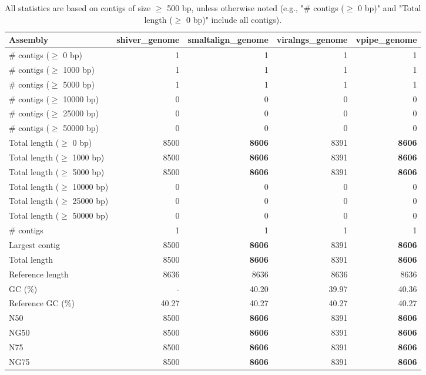 \documentclass[12pt,a4paper]{article}
\begin{document}
\begin{table}[ht]
\begin{center}
\caption{All statistics are based on contigs of size $\geq$ 500 bp, unless otherwise noted (e.g., "\# contigs ($\geq$ 0 bp)" and "Total length ($\geq$ 0 bp)" include all contigs).}
\begin{tabular}{|l*{4}{|r}|}
\hline
Assembly & shiver\_genome & smaltalign\_genome & viralngs\_genome & vpipe\_genome \\ \hline
\# contigs ($\geq$ 0 bp) & 1 & 1 & 1 & 1 \\ \hline
\# contigs ($\geq$ 1000 bp) & 1 & 1 & 1 & 1 \\ \hline
\# contigs ($\geq$ 5000 bp) & 1 & 1 & 1 & 1 \\ \hline
\# contigs ($\geq$ 10000 bp) & 0 & 0 & 0 & 0 \\ \hline
\# contigs ($\geq$ 25000 bp) & 0 & 0 & 0 & 0 \\ \hline
\# contigs ($\geq$ 50000 bp) & 0 & 0 & 0 & 0 \\ \hline
Total length ($\geq$ 0 bp) & 8500 & {\bf 8606} & 8391 & {\bf 8606} \\ \hline
Total length ($\geq$ 1000 bp) & 8500 & {\bf 8606} & 8391 & {\bf 8606} \\ \hline
Total length ($\geq$ 5000 bp) & 8500 & {\bf 8606} & 8391 & {\bf 8606} \\ \hline
Total length ($\geq$ 10000 bp) & 0 & 0 & 0 & 0 \\ \hline
Total length ($\geq$ 25000 bp) & 0 & 0 & 0 & 0 \\ \hline
Total length ($\geq$ 50000 bp) & 0 & 0 & 0 & 0 \\ \hline
\# contigs & 1 & 1 & 1 & 1 \\ \hline
Largest contig & 8500 & {\bf 8606} & 8391 & {\bf 8606} \\ \hline
Total length & 8500 & {\bf 8606} & 8391 & {\bf 8606} \\ \hline
Reference length & 8636 & 8636 & 8636 & 8636 \\ \hline
GC (\%) & - & 40.20 & 39.97 & 40.36 \\ \hline
Reference GC (\%) & 40.27 & 40.27 & 40.27 & 40.27 \\ \hline
N50 & 8500 & {\bf 8606} & 8391 & {\bf 8606} \\ \hline
NG50 & 8500 & {\bf 8606} & 8391 & {\bf 8606} \\ \hline
N75 & 8500 & {\bf 8606} & 8391 & {\bf 8606} \\ \hline
NG75 & 8500 & {\bf 8606} & 8391 & {\bf 8606} \\ \hline

\end{tabular}
\end{center}
\end{table}
\end{document}
